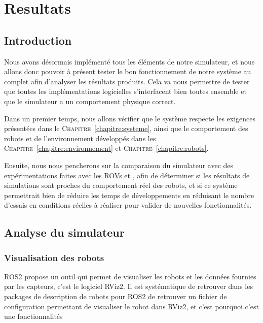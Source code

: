 \chapter{Resultats}
\label{chapter:resultats}
	
	\section{Introduction}

		Nous avons désormais implémenté tous les éléments de notre simulateur, et nous allons donc pouvoir à présent tester le bon fonctionnement de notre système au complet afin d'analyser les résultats produits. Cela va nous permettre de tester que toutes les implémentations logicielles s'interfacent bien toutes ensemble et que le simulateur a un comportement physique correct.
		
		Dans un premier temps, nous allons vérifier que le système respecte les exigences présentées dans le \textsc{Chapitre}~\ref{chapitre:systeme}, ainsi que le comportement des robots et de l'environnement développés dans les \textsc{Chapitre}~\ref{chapitre:environnement} et \textsc{Chapitre}~\ref{chapitre:robots}.

		Ensuite, nous nous pencherons sur la comparaison du simulateur avec des expérimentations faites avec les \gls{ROV}s \argos{} et \atoll{}, afin de déterminer si les résultats de simulations sont proches du comportement réel des robots, et si ce système permettrait bien de réduire les temps de développements en réduisant le nombre d'essais en conditions réelles à réaliser pour valider de nouvelles fonctionnalités.

	\section{Analyse du simulateur}

		\subsection{Visualisation des robots}

			\gls{ROS2} propose un outil qui permet de visualiser les robots et les données fournies par les capteurs, c'est le logiciel \gls{RViz2}. Il est systématique de retrouver dans les packages de description de robots pour \gls{ROS2} de retrouver un fichier de configuration permettant de visualiser le robot dans \gls{RViz2}, et c'est pourquoi c'est une fonctionnalités

